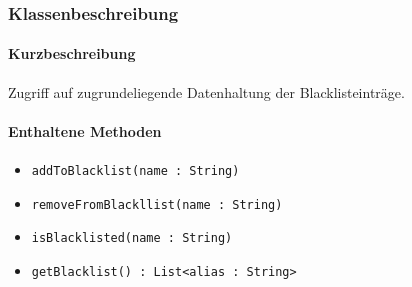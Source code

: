 \subsubsection*{Klassenbeschreibung}%
\paragraph*{Kurzbeschreibung}
Zugriff auf zugrundeliegende Datenhaltung der Blacklisteinträge.
\paragraph*{Enthaltene Methoden}
\begin{itemize}
    \item \texttt{addToBlacklist(name : String)}
    \item \texttt{removeFromBlackllist(name : String)}
    \item \texttt{isBlacklisted(name : String)}
    \item \texttt{getBlacklist() : List<alias : String>}
\end{itemize}
